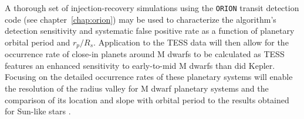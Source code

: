 A thorough set of injection-recovery simulations using the \texttt{ORION}
transit detection code (see chapter~\ref{chap:orion}) may be used to
characterize the algorithm's detection sensitivity and systematic false positive
rate as a function of planetary orbital period and $r_p/R_s$. Application to the
TESS data will then allow for the occurrence rate of close-in planets around M
dwarfs to be calculated as TESS features an enhanced sensitivity to early-to-mid
M dwarfs than did Kepler. Focusing on the detailed occurrence rates of these
planetary systems will enable the resolution of the radius valley for M dwarf
planetary systems and the comparison of its location and slope with orbital
period to the results obtained for Sun-like stars \citep{fulton18}.
